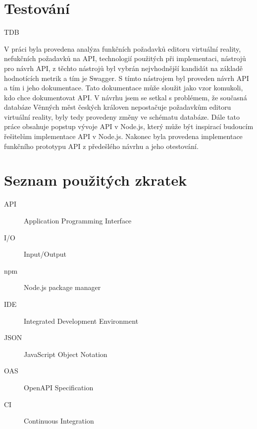 \documentclass[thesis=B,czech]{FITthesis}[2012/06/26]
\begin{document}
\chapter{Testování}

TDB

\begin{conclusion}
    V práci byla provedena analýza funkčních požadavků editoru virtuální reality, nefukčních požadavků na API, technologií použitých při implementaci, nástrojů pro návrh API, z těchto nástrojů byl vybrán nejvhodnější kandidát na základě hodnotících metrik a tím je Swagger. S tímto nástrojem byl proveden návrh API a tím i jeho dokumentace. Tato dokumentace může sloužit jako vzor komukoli, kdo chce dokumentovat API.
    V návrhu jsem se setkal s problémem, že současná databáze Věnných měst českých královen nepostačuje požadavkům editoru virtuální reality, byly tedy provedeny změny ve schématu databáze.
    Dále tato práce obsahuje popstup vývoje API v Node.js, který může být inspirací budoucím řešitelům implementace API v Node.js.
    Nakonec byla provedena implementace funkčního prototypu API z předešlého návrhu a jeho otestování. \cite{kobltypo}

\end{conclusion}




\appendix

\chapter{Seznam použitých zkratek}
\begin{description}
	\item[API] Application Programming Interface
	\item[I/O] Input/Output
	\item[npm] Node.js package manager
	\item[IDE] Integrated Development Environment
	\item[JSON] JavaScript Object Notation
	\item[OAS] OpenAPI Specification
	\item[CI] Continuous Integration
\end{description}
\end{document}
